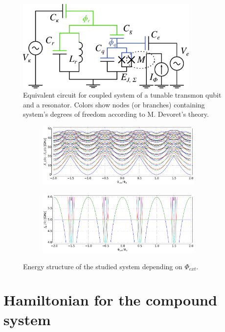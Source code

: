 \documentclass[12pt]{report}
\numberwithin{equation}{section}
\begin{document}
\begin{figure}
\centering
\includegraphics[width=0.8\textwidth]{xmon_resonator}
\caption{Equivalent circuit for coupled system of a tunable transmon qubit and a resonator. Colors show nodes (or branches) containing system's degrees of freedom according to M. Devoret's theory\cite{Devoret1995}.}
\label{fig:xmon-resonator}
\end{figure}
\begin{figure}
\centering
\begin{subfigure}[t]{\textwidth}
\centering
\includegraphics[width=0.9\textwidth]{levels}
\end{subfigure}

\begin{subfigure}[t]{\textwidth}
\centering
\includegraphics[width=0.9\textwidth]{freqs}
\end{subfigure}
\caption{Energy structure of the studied system depending on $\Phi_{ext}$.}
\label{fig:levels}
\end{figure}
\section{Hamiltonian for the compound system}
\end{document}
